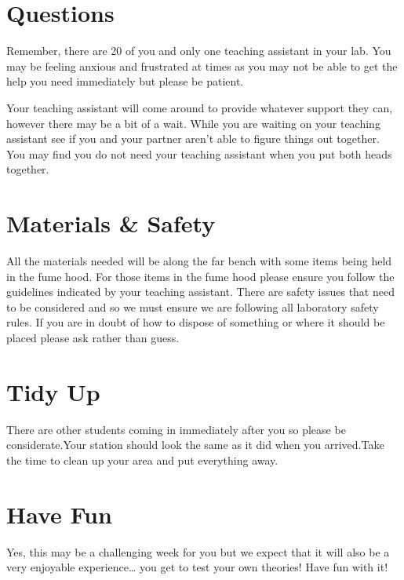 \documentclass[
]{book}
\begin{document}
\hypertarget{questions}{%
\section*{Questions}\label{questions}}

Remember, there are 20 of you and only one teaching assistant in your lab. You may be feeling anxious and frustrated at times as you may not be able to get the help you need immediately but please be patient.

Your teaching assistant will come around to provide whatever support they can, however there may be a bit of a wait. While you are waiting on your teaching assistant see if you and your partner aren't able to figure things out together. You may find you do not need your teaching assistant when you put both heads together.

\hypertarget{materials-safety}{%
\section*{Materials \& Safety}\label{materials-safety}}

All the materials needed will be along the far bench with some items being held in the fume hood. For those items in the fume hood please ensure you follow the guidelines indicated by your teaching assistant. There are safety issues that need to be considered and so we must ensure we are following all laboratory safety rules. If you are in doubt of how to dispose of something or where it should be placed please ask rather than guess.

\hypertarget{tidy-up}{%
\section*{Tidy Up}\label{tidy-up}}

There are other students coming in immediately after you so please be considerate.Your station should look the same as it did when you arrived.Take the time to clean up your area and put everything away.

\hypertarget{have-fun}{%
\section*{Have Fun}\label{have-fun}}

Yes, this may be a challenging week for you but we expect that it will also be a very enjoyable experience\ldots{} you get to test your own theories! Have fun with it!
\end{document}
